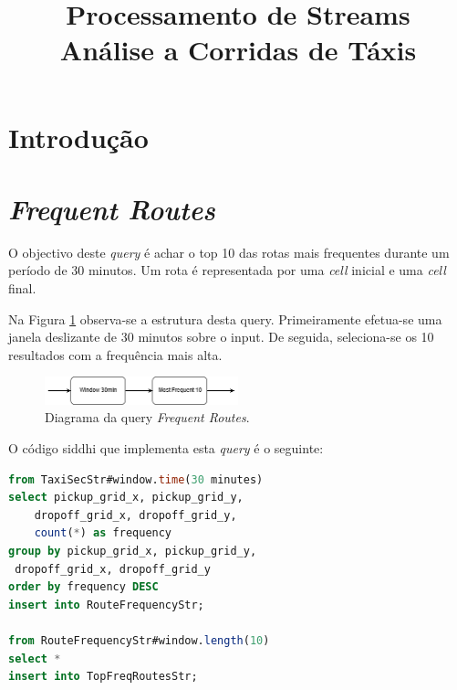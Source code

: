 \documentclass[article]{IEEEtran}
\begin{document}
\title{Processamento de Streams\\Análise a Corridas de Táxis}


\author{

\and
{}
}

\maketitle



\section{Introdução}

\section{\textit{Frequent Routes}}

O objectivo deste \textit{query} é achar o top 10 das rotas mais frequentes durante um período de 30 minutos. Um rota é representada por uma \textit{cell} inicial e uma \textit{cell} final.

Na Figura \ref{fig:frequentRoutesDiagram} observa-se a estrutura desta query. Primeiramente efetua-se uma janela deslizante de 30 minutos sobre o input. De seguida, seleciona-se os 10 resultados com a frequência mais alta.

\begin{figure}[hbtp]
    \centering
        \includegraphics[width=0.5\textwidth]{images/frequentRoutesDiagram}
    \caption{Diagrama da query \textit{Frequent Routes}.}
    \label{fig:frequentRoutesDiagram}
\end{figure}

O código siddhi que implementa esta \textit{query} é o seguinte:

\begin{lstlisting}[language=SQL]
from TaxiSecStr#window.time(30 minutes)
select pickup_grid_x, pickup_grid_y, 
	dropoff_grid_x, dropoff_grid_y,
	count(*) as frequency
group by pickup_grid_x, pickup_grid_y,
 dropoff_grid_x, dropoff_grid_y
order by frequency DESC
insert into RouteFrequencyStr;

from RouteFrequencyStr#window.length(10)
select *
insert into TopFreqRoutesStr;
\end{lstlisting}
\end{document}
